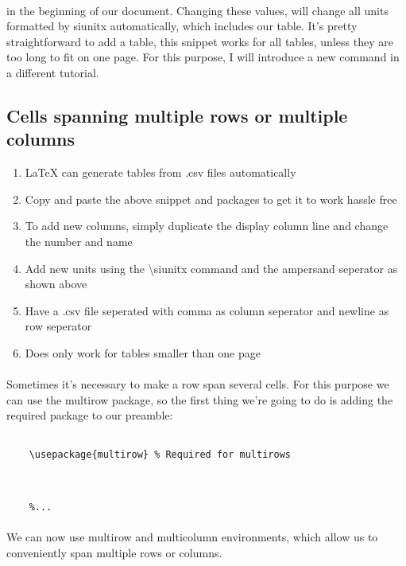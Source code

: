   \paragraph{}
  in the beginning of our document. Changing these values, will change all units formatted by siunitx automatically, which includes our table. It's pretty straightforward to add a table, this snippet works for all tables, unless they are too long to fit on one page. For this purpose, I will introduce a new command in a different tutorial.



  \subsection{Cells spanning multiple rows or multiple columns}
    \begin{enumerate}[label=\alph*)]
      \item LaTeX can generate tables from .csv files automatically
      \item Copy and paste the above snippet and packages to get it to work hassle free
      \item To add new columns, simply duplicate the display column line and change the number and name
      \item Add new units using the \textbackslash siunitx command and the ampersand seperator as shown above
      \item Have a .csv file seperated with comma as column seperator and newline as row seperator
      \item Does only work for tables smaller than one page
    \end{enumerate}
  \paragraph{}
  Sometimes it's necessary to make a row span several cells. For this purpose we can use the multirow package, so the first thing we're going to do is adding the required package to our preamble:

  \begin{lstlisting}[language={[LaTeX]TeX},breaklines=true,frame=single]
    %...

    \usepackage{multirow} % Required for multirows
    
     
    
    %...
  \end{lstlisting}
  \paragraph{}
  We can now use multirow and multicolumn environments, which allow us to conveniently span multiple rows or columns.
  


